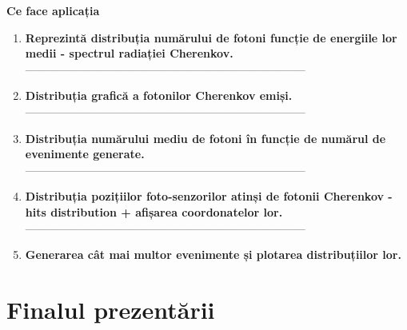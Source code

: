 \documentclass[10pt]{beamer}
\begin{document}
\begin{frame}{\textbf{Ce face aplicația}}

\vspace{0cm}
\begin{enumerate}

\large
    \item \makebox[0.5cm]{} \textbf{Reprezintă distribuția numărului de fotoni funcție de energiile lor medii - spectrul radiației Cherenkov.}
    \\---------------------------------------------------------------------------
    \item \makebox[0.5cm]{} \textbf{Distribuția grafică a fotonilor Cherenkov emiși.}
    \\---------------------------------------------------------------------------
    \item \makebox[0.5cm]{} \textbf{Distribuția numărului mediu de fotoni în funcție de numărul de evenimente generate.}
    \\---------------------------------------------------------------------------
    \item \makebox[0.5cm]{} \textbf{Distribuția pozițiilor foto-senzorilor atinși de fotonii Cherenkov - hits distribution + afișarea coordonatelor lor.} 
    \\---------------------------------------------------------------------------
    \item \makebox[0.5cm]{} \textbf{Generarea cât mai multor evenimente și plotarea distribuțiilor lor.} 
    
\end{enumerate}
\end{frame}


\section{ \textbf{Finalul prezentării}}

\begin{frame}{}


\end{frame}
\end{document}
